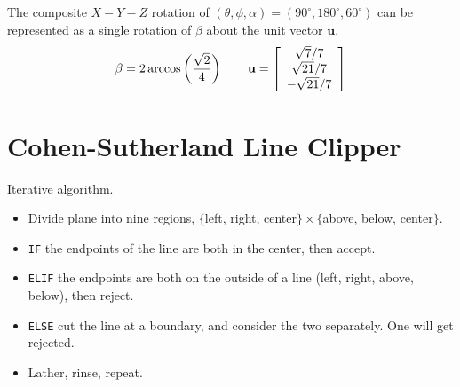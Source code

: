\documentclass[11pt]{article}
\begin{document}
\begin{spacing}{1.2}
The composite $X-Y-Z$ rotation of $(\theta,\phi,\alpha) = (90^{\circ}, 180^{\circ}, 60^{\circ})$ can be represented as a single rotation of $\beta$ about the unit vector $\mathbf{u}$. 
$$\beta = 2 \arccos\left( \frac{\sqrt2}{4} \right)
\qquad
\mathbf{u} = 
\left[
\begin{array}{c}
	\sqrt7/7 \cr
	\sqrt{21}/7\cr
	-\sqrt{21}/7 \cr
\end{array}
\right]
$$

\section{Cohen-Sutherland Line Clipper}

Iterative algorithm.

\begin{itemize}
	\item Divide plane into nine regions, $\{$left, right, center$\} \times \{$above, below, center$\}$.
	\item {\tt IF} the endpoints of the line are both in the center, then accept.  
	\item {\tt ELIF} the endpoints are both on the outside of a line (left, right, above, below), then reject.  
	\item {\tt ELSE} cut the line at a boundary, and consider the two separately.  One will get rejected.  
	\item Lather, rinse, repeat.  
\end{itemize}


\end{spacing}
\end{document}
